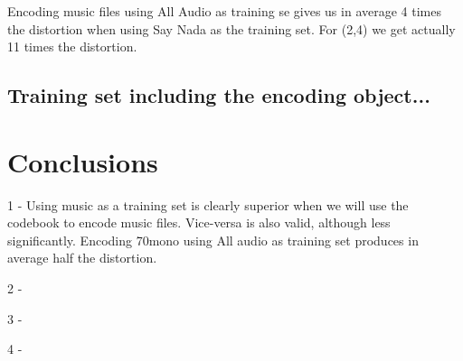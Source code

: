 \documentclass[a4paper, 11pt]{article}
\begin{document}
			
			Encoding music files using All Audio as training se gives us in average 4 times the distortion when using Say Nada as the training set.
			For (2,4) we get actually 11 times the distortion.
			
		
		\subsection{Training set including the encoding object...}
			
	
	\section{Conclusions}
	
		1 - Using music as a training set is clearly superior when we will use the codebook to encode music files.
			Vice-versa is also valid, although less significantly. Encoding 70mono using All audio as training set produces in average half the distortion.
		
		2 - 
		
		3 - 
		
		4 - 
		
		
		
		
		
		
\end{document}
